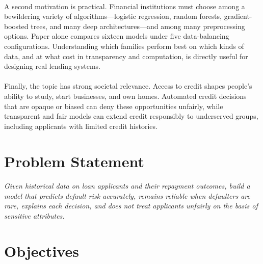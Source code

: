 \documentclass[12pt,a4paper,final]{extreport}
\begin{document}
\paragraph{} A second motivation is practical. Financial institutions must choose among a bewildering variety of algorithms---logistic regression, random forests, gradient-boosted trees, and many deep architectures---and among many preprocessing options. Paper \cite{p2} alone compares sixteen models under five data-balancing configurations. Understanding which families perform best on which kinds of data, and at what cost in transparency and computation, is directly useful for designing real lending systems.

\paragraph{} Finally, the topic has strong societal relevance. Access to credit shapes people's ability to study, start businesses, and own homes. Automated credit decisions that are opaque or biased can deny these opportunities unfairly, while transparent and fair models can extend credit responsibly to underserved groups, including applicants with limited credit histories.

\section{Problem Statement}

\paragraph{} \emph{Given historical data on loan applicants and their repayment outcomes, build a model that predicts default risk accurately, remains reliable when defaulters are rare, explains each decision, and does not treat applicants unfairly on the basis of sensitive attributes.}

\section{Objectives}
\end{document}
